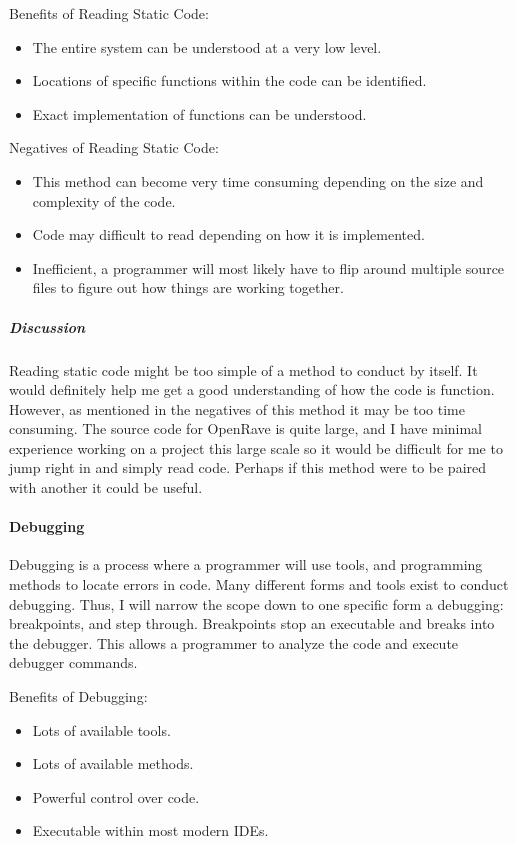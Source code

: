 Benefits of Reading Static Code:
\begin{itemize}
\item The entire system can be understood at a very low level.
\item Locations of specific functions within the code can be identified.
\item Exact implementation of functions can be understood.
\end{itemize}

Negatives of Reading Static Code:
\begin{itemize}
\item This method can become very time consuming depending on the size and complexity of the code.
\item Code may difficult to read depending on how it is implemented.
\item Inefficient, a programmer will most likely have to flip around multiple source files to figure out how things are working together.
\end{itemize}

\subparagraph{Discussion}
Reading static code might be too simple of a method to conduct by itself.
It would definitely help me get a good understanding of how the code is function.
However, as mentioned in the negatives of this method it may be too time consuming.
The source code for OpenRave is quite large, and I have minimal experience working on a project this large scale so it would be difficult for me to jump right in and simply read code.
Perhaps if this method were to be paired with another it could be useful.

\paragraph{Debugging}
Debugging is a process where a programmer will use tools, and programming methods to locate errors in code.
Many different forms and tools exist to conduct debugging.\cite{debugging}
Thus, I will narrow the scope down to one specific form a debugging: breakpoints, and step through.
Breakpoints stop an executable and breaks into the debugger.
This allows a programmer to analyze the code and execute debugger commands.\cite{debugging}

Benefits of Debugging:
\begin{itemize}
\item Lots of available tools.
\item Lots of available methods.
\item Powerful control over code.
\item Executable within most modern IDEs.
\end{itemize}

